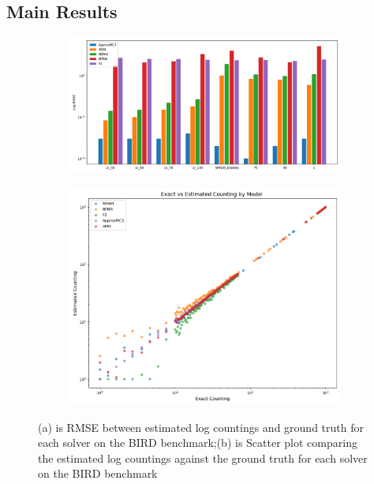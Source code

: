 \subsection{Main Results}
\begin{figure}[htbp]
    \centering
    \begin{subfigure}{0.48\textwidth}
        \centering
        \includegraphics[width=\linewidth]{png/柱状图.png} %
        \caption{}
        \label{fig:sub1}
    \end{subfigure}
    \hfill %
    \begin{subfigure}{0.48\textwidth}
        \centering
        \includegraphics[width=\linewidth]{png/plot.png} %
        \caption{}
        \label{fig:sub2}
    \end{subfigure}
    \caption{(a) is RMSE between estimated log countings and ground truth for each solver on the BIRD benchmark;(b) is Scatter plot comparing the estimated log countings against the ground truth for each solver on the BIRD benchmark}
    \label{fig:total}
\end{figure}
